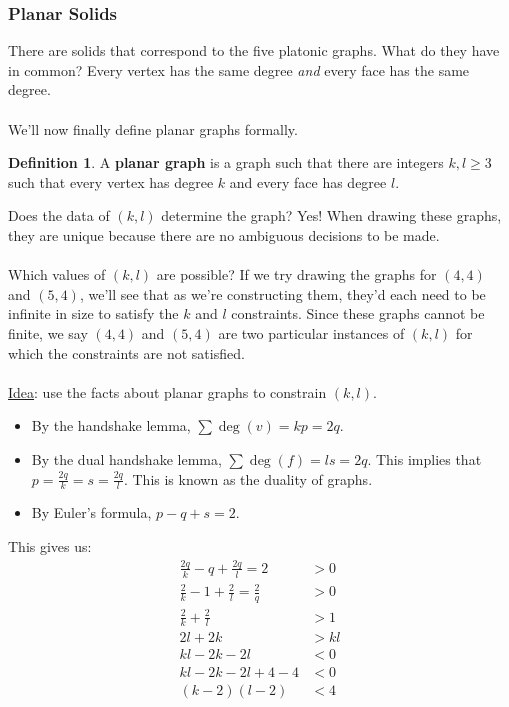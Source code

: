 \documentclass[]{article}
\theoremstyle{definition}
\newtheorem*{defn}{Definition}
\begin{document}
			\subsubsection{Planar Solids}
				There are solids that correspond to the five platonic graphs. What do they have in common? Every vertex has the same degree \emph{and} every face has the same degree. 
				\\ \\
				We'll now finally define planar graphs formally.
				\begin{defn}
					A \textbf{planar graph} is a graph such that there are integers $k, l \ge 3$ such that every vertex has degree $k$ and every face has degree $l$.
				\end{defn}

				Does the data of $(k, l)$ determine the graph? Yes! When drawing these graphs, they are unique because there are no ambiguous decisions to be made.
				\\ \\
				Which values of $(k, l)$ are possible? If we try drawing the graphs for $(4,4)$ and $(5,4)$, we'll see that as we're constructing them, they'd each need to be infinite in size to satisfy the $k$ and $l$ constraints. Since these graphs cannot be finite, we say $(4,4)$ and $(5,4)$ are two particular instances of $(k, l)$ for which the constraints are not satisfied.
				\\ \\
				\underline{Idea}: use the facts about planar graphs to constrain $(k, l)$.
				
				\begin{itemize}
					\item By the handshake lemma, $\sum \deg(v) = kp = 2q$.
					\item By the dual handshake lemma, $\sum \deg(f) = ls = 2q$. This implies that $p = \frac{2q}{k} = s = \frac{2q}{l}$. This is known as the duality of graphs.
					\item By Euler's formula, $p - q + s = 2$.
				\end{itemize}

				This gives us:
				\begin{align*}
					\frac{2q}{k} - q + \frac{2q}{l} = 2 &> 0 \\
					\frac{2}{k} - 1 + \frac{2}{l} = \frac{2}{q} &> 0 \\
					\frac{2}{k} + \frac{2}{l} &> 1 \\
					2l + 2k &> kl \\
					kl - 2k - 2l &< 0 \\
					kl - 2k - 2l + 4 - 4 &< 0 \\
					(k-2)(l-2) &< 4 
				\end{align*}
\end{document}
